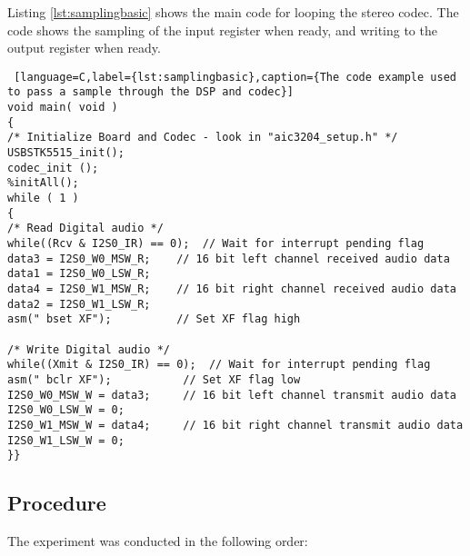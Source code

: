 Listing \ref{lst:samplingbasic} shows the main code for looping the stereo codec. The code shows the sampling of the input register when ready, and writing to the output register when ready. 

\begin{lstlisting} [language=C,label={lst:samplingbasic},caption={The code example used to pass a sample through the DSP and codec}]
void main( void )
{
/* Initialize Board and Codec - look in "aic3204_setup.h" */
USBSTK5515_init();
codec_init ();
%initAll();
while ( 1 )
{
/* Read Digital audio */
while((Rcv & I2S0_IR) == 0);  // Wait for interrupt pending flag
data3 = I2S0_W0_MSW_R;    // 16 bit left channel received audio data
data1 = I2S0_W0_LSW_R;
data4 = I2S0_W1_MSW_R;    // 16 bit right channel received audio data
data2 = I2S0_W1_LSW_R;
asm(" bset XF");	  	  // Set XF flag high

/* Write Digital audio */
while((Xmit & I2S0_IR) == 0);  // Wait for interrupt pending flag
asm(" bclr XF");		   // Set XF flag low
I2S0_W0_MSW_W = data3;     // 16 bit left channel transmit audio data
I2S0_W0_LSW_W = 0;
I2S0_W1_MSW_W = data4;     // 16 bit right channel transmit audio data
I2S0_W1_LSW_W = 0;
}}
\end{lstlisting}



\subsection{Procedure}

The experiment was conducted in the following order:

